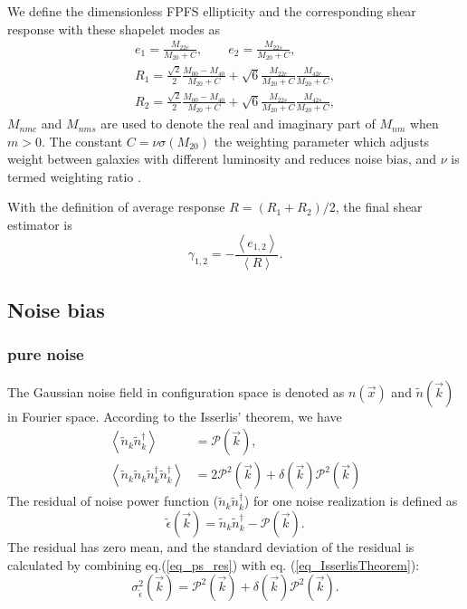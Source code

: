 We define the dimensionless FPFS ellipticity and the corresponding shear
response with these shapelet modes as
\begin{align}\label{ellipticity_define}
e_1=\frac{M_{22c}}{M_{20}+C},\qquad
e_2=\frac{M_{22s}}{M_{20}+C},\\
R_{1}=\frac{\sqrt{2}}{2}\frac{M_{00}-M_{40}}{M_{20}+C}
    +\sqrt{6}\frac{M_{22c}}{M_{20}+C}\frac{M_{42c}}{M_{20}+C},\\
R_{2}=\frac{\sqrt{2}}{2}\frac{M_{00}-M_{40}}{M_{20}+C}
    +\sqrt{6}\frac{M_{22s}}{M_{20}+C}\frac{M_{42s}}{M_{20}+C},
\end{align}
$M_{nmc}$ and $M_{nms}$ are used to denote the real and imaginary part of
$M_{nm}$ when $m>0$. The constant $C=\nu \sigma(M_{20})$ the weighting
parameter which adjusts weight between galaxies with different luminosity and
reduces noise bias, and $\nu$ is termed weighting ratio \citep{FPFS-Li2018}.

With the definition of average response $R= (R_1+R_2)/2$, the final shear
estimator is
\begin{equation}
\gamma_{1,2} =-\frac{\left\langle e_{1,2}
\right\rangle}{\left\langle R \right\rangle}.
\end{equation}

\subsection{Noise bias}
\label{sec_Method_noise}

\subsubsection{pure noise}

The Gaussian noise field in configuration space is denoted as $n(\vec{x})$ and
$\tilde{n}(\vec{k})$ in Fourier space. According to the Isserlis' theorem, we
have
\begin{equation}\label{eq_IsserlisTheorem}
\begin{split}
    \left\langle\tilde{n}_k\tilde{n}_k^{\dagger}\right\rangle
    &=\mathcal{P}(\vec{k}),\\
    \left\langle\tilde{n}_k\tilde{n}_k\tilde{n}_k^\dagger\tilde{n}_k^\dagger\right\rangle
    &=
    2\mathcal{P}^2(\vec{k})+\delta(\vec{k})\mathcal{P}^2(\vec{k})
\end{split}
\end{equation}
The residual of noise power function ($\tilde{n}_k\tilde{n}_k^{\dagger}$) for
one noise realization is defined as
\begin{equation}\label{eq_ps_res}
    \tilde{\epsilon}(\vec{k})=\tilde{n}_k\tilde{n}_k^\dagger
    -\mathcal{P}(\vec{k}).
\end{equation}
The residual has zero mean, and the standard deviation of the residual is
calculated by combining eq.(\ref{eq_ps_res}) with eq.
(\ref{eq_IsserlisTheorem}):
\begin{equation}
    \sigma^2_{\tilde{\epsilon}}(\vec{k})=
    \mathcal{P}^2(\vec{k})+\delta(\vec{k})\mathcal{P}^2(\vec{k}).
\end{equation}

